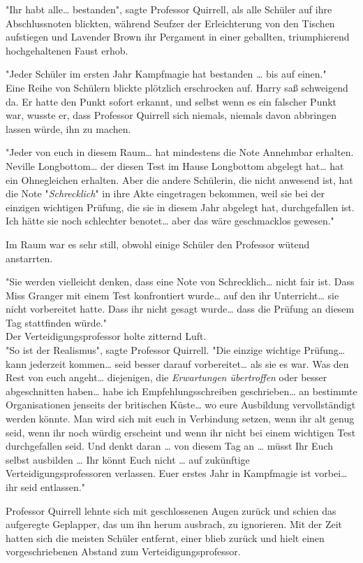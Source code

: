 {"Ihr habt alle… bestanden", sagte Professor Quirrell, als alle Schüler auf ihre Abschlussnoten blickten, während Seufzer der Erleichterung von den Tischen aufstiegen und Lavender Brown ihr Pergament in einer geballten, triumphierend hochgehaltenen Faust erhob.

"Jeder Schüler im ersten Jahr Kampfmagie hat bestanden … bis auf einen."\\ Eine Reihe von Schülern blickte plötzlich erschrocken auf. Harry saß schweigend da. Er hatte den Punkt sofort erkannt, und selbst wenn es ein falscher Punkt war, wusste er, dass Professor Quirrell sich niemals, niemals davon abbringen lassen würde, ihn zu machen.

"Jeder von euch in diesem Raum… hat mindestens die Note Annehmbar erhalten. Neville Longbottom… der diesen Test im Hause Longbottom abgelegt hat… hat ein Ohnegleichen erhalten. Aber die andere Schülerin, die nicht anwesend ist, hat die Note "\emph{Schrecklich}" in ihre Akte eingetragen bekommen, weil sie bei der einzigen wichtigen Prüfung, die sie in diesem Jahr abgelegt hat, durchgefallen ist. Ich hätte sie noch schlechter benotet… aber das wäre geschmacklos gewesen."

Im Raum war es sehr still, obwohl einige Schüler den Professor wütend anstarrten.

"Sie werden vielleicht denken, dass eine Note von Schrecklich… nicht fair ist. Dass Miss Granger mit einem Test konfrontiert wurde… auf den ihr Unterricht… sie nicht vorbereitet hatte. Dass ihr nicht gesagt wurde… dass die Prüfung an diesem Tag stattfinden würde."\\ Der Verteidigungsprofessor holte zitternd Luft.\\ "So ist der Realismus", sagte Professor Quirrell. "Die einzige wichtige Prüfung… kann jederzeit kommen… seid besser darauf vorbereitet… als sie es war. Was den Rest von euch angeht… diejenigen, die \emph{Erwartungen übertroffen} oder besser abgeschnitten haben… habe ich Empfehlungsschreiben geschrieben… an bestimmte Organisationen jenseits der britischen Küste… wo eure Ausbildung vervollständigt werden könnte. Man wird sich mit euch in Verbindung setzen, wenn ihr alt genug seid, wenn ihr noch würdig erscheint und wenn ihr nicht bei einem wichtigen Test durchgefallen seid. Und denkt daran … von diesem Tag an … müsst Ihr Euch selbst ausbilden … Ihr könnt Euch nicht … auf zukünftige Verteidigungsprofessoren verlassen. Euer erstes Jahr in Kampfmagie ist vorbei… ihr seid entlassen."

Professor Quirrell lehnte sich mit geschlossenen Augen zurück und schien das aufgeregte Geplapper, das um ihn herum ausbrach, zu ignorieren. Mit der Zeit hatten sich die meisten Schüler entfernt, einer blieb zurück und hielt einen vorgeschriebenen Abstand zum Verteidigungsprofessor.

}

